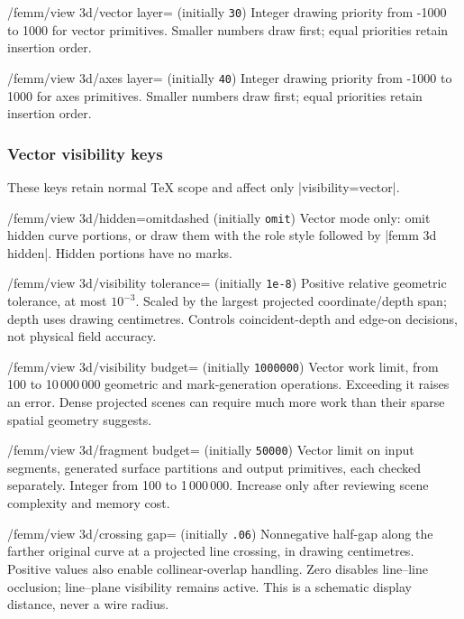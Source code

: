 \begin{key}{/femm/view 3d/vector layer= (initially \texttt{30})}
Integer drawing priority from -1000 to 1000 for vector primitives. Smaller numbers draw first; equal priorities retain insertion order.
\end{key}
\begin{key}{/femm/view 3d/axes layer= (initially \texttt{40})}
Integer drawing priority from -1000 to 1000 for axes primitives. Smaller numbers draw first; equal priorities retain insertion order.
\end{key}

\subsubsection{Vector visibility keys}
These keys retain normal TeX scope and affect only |visibility=vector|.
\begin{key}{/femm/view 3d/hidden=omit\textbar dashed (initially \texttt{omit})}
Vector mode only: omit hidden curve portions, or draw them with the role style followed by |femm 3d hidden|. Hidden portions have no marks.
\end{key}
\begin{key}{/femm/view 3d/visibility tolerance= (initially \texttt{1e-8})}
Positive relative geometric tolerance, at most $10^{-3}$. Scaled by the largest projected coordinate/depth span; depth uses drawing centimetres. Controls coincident-depth and edge-on decisions, not physical field accuracy.
\end{key}
\begin{key}{/femm/view 3d/visibility budget= (initially \texttt{1000000})}
Vector work limit, from 100 to 10\,000\,000 geometric and mark-generation operations. Exceeding it raises an error. Dense projected scenes can require much more work than their sparse spatial geometry suggests.
\end{key}
\begin{key}{/femm/view 3d/fragment budget= (initially \texttt{50000})}
Vector limit on input segments, generated surface partitions and output primitives, each checked separately. Integer from 100 to 1\,000\,000. Increase only after reviewing scene complexity and memory cost.
\end{key}
\begin{key}{/femm/view 3d/crossing gap= (initially \texttt{.06})}
Nonnegative half-gap along the farther original curve at a projected line crossing, in drawing centimetres. Positive values also enable collinear-overlap handling. Zero disables line--line occlusion; line--plane visibility remains active. This is a schematic display distance, never a wire radius.
\end{key}
